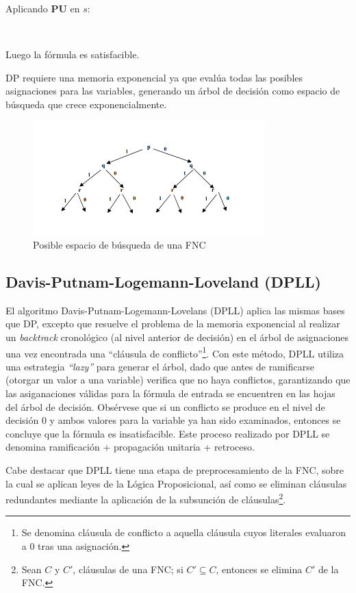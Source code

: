 Aplicando \textbf{PU} en ${s}$:

${}$

Luego la fórmula es satisfacible.


DP requiere una memoria exponencial ya que evalúa todas las posibles asignaciones para las variables, generando un árbol de decisión como espacio de búsqueda que crece exponencialmente.

\begin{figure}[ht]
    \centering
    \includegraphics[width=0.8\textwidth]{Graphics/arboldp.png}
    \caption{Posible espacio de búsqueda de una FNC}
    \label{fig:arbol DP}
\end{figure}

\subsection{Davis-Putnam-Logemann-Loveland (DPLL)}
El algoritmo Davis-Putnam-Logemann-Lovelans (DPLL) aplica las mismas bases que DP, excepto que resuelve el problema de la memoria exponencial al realizar un \textit{backtrack} cronológico (al nivel anterior de decisión) en el árbol de asignaciones una vez encontrada una ``cláusula de conflicto''\footnote{Se denomina cláusula de conflicto a aquella cláusula cuyos literales evaluaron a 0 tras una asignación.}. Con este método, DPLL utiliza una estrategia \textit{``lazy''} para generar el árbol, dado que antes de ramificarse (otorgar un valor a una variable) verifica que no haya conflictos, garantizando que las asiganaciones válidas para la fórmula de entrada se encuentren en las hojas del árbol de decisión. Obsérvese que si un conflicto se produce en el nivel de decisión 0 y ambos valores para la variable ya han sido examinados, entonces se concluye que la fórmula es insatisfacible. Este proceso realizado por DPLL se denomina ramificación + propagación unitaria + retroceso.

Cabe destacar que DPLL tiene una etapa de preprocesamiento de la FNC, sobre la cual se aplican leyes de la Lógica Proposicional, así como se eliminan cláusulas redundantes mediante la aplicación de la subsunción de cláusulas\footnote{Sean $C$ y $C'$, cláusulas de una FNC; si $C' \subseteq C$, entonces se elimina $C'$ de la FNC.}. 

